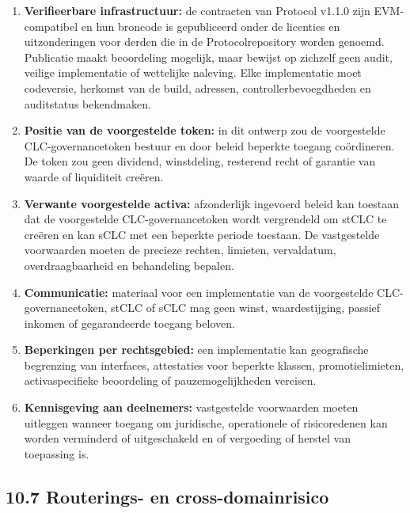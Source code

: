 \documentclass[11pt]{article}
\begin{document}
\begin{enumerate}[leftmargin=*]
\item \textbf{Verifieerbare infrastructuur:} de contracten van Protocol v1.1.0 zijn EVM-compatibel en hun broncode is gepubliceerd onder de licenties en uitzonderingen voor derden die in de Protocolrepository worden genoemd. Publicatie maakt beoordeling mogelijk, maar bewijst op zichzelf geen audit, veilige implementatie of wettelijke naleving. Elke implementatie moet codeversie, herkomst van de build, adressen, controllerbevoegdheden en auditstatus bekendmaken.
\item \textbf{Positie van de voorgestelde token:} in dit ontwerp zou de voorgestelde CLC-governancetoken bestuur en door beleid beperkte toegang coördineren. De token zou geen dividend, winstdeling, resterend recht of garantie van waarde of liquiditeit creëren.
\item \textbf{Verwante voorgestelde activa:} afzonderlijk ingevoerd beleid kan toestaan dat de voorgestelde CLC-governancetoken wordt vergrendeld om stCLC te creëren en kan sCLC met een beperkte periode toestaan. De vastgestelde voorwaarden moeten de precieze rechten, limieten, vervaldatum, overdraagbaarheid en behandeling bepalen.
\item \textbf{Communicatie:} materiaal voor een implementatie van de voorgestelde CLC-governancetoken, stCLC of sCLC mag geen winst, waardestijging, passief inkomen of gegarandeerde toegang beloven.
\item \textbf{Beperkingen per rechtsgebied:} een implementatie kan geografische begrenzing van interfaces, attestaties voor beperkte klassen, promotielimieten, activaspecifieke beoordeling of pauzemogelijkheden vereisen.
\item \textbf{Kennisgeving aan deelnemers:} vastgestelde voorwaarden moeten uitleggen wanneer toegang om juridische, operationele of risicoredenen kan worden verminderd of uitgeschakeld en of vergoeding of herstel van toepassing is.
\end{enumerate}
\subsection*{10.7 Routerings- en cross-domainrisico}
\end{document}
